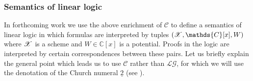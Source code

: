 \documentclass[english,letter paper,12pt,leqno]{article}
\theoremstyle{example}
\numberwithin{equation}{section}
\def\LG{\mathcal{LG}}
\def\nC{\mathds{C}}
\def\L{\mathcal{C}}
\begin{document}



\subsubsection{Semantics of linear logic}

In forthcoming work we use the above enrichment of $\L$ to define a semantics of linear logic \cite{girard_llogic} in which formulas are interpreted by tuples $(\md{X}, \nC[x], W)$ where $\mathscr{X}$ is a scheme and $W \in \nC[x]$ is a potential. Proofs in the logic are interpreted by certain correspondences between these pairs. Let us briefly explain the general point which leads us to use $\L$ rather than $\LG$, for which we will use the denotation of the Church numeral $\underline{2}$ (see \cite{murfet_ll}).
\end{document}
